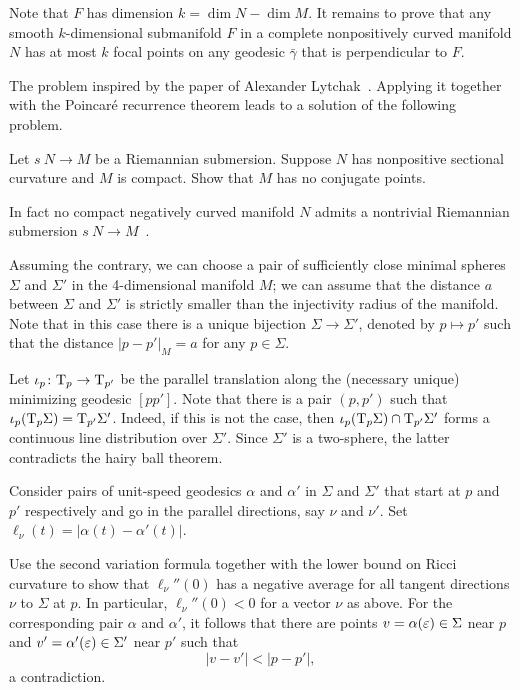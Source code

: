 Note that $F$ has dimension $k=\dim N-\dim M$.
It remains to prove that any smooth $k$-dimensional submanifold $F$ in a complete nonpositively curved manifold $N$ has at most $k$ focal points on any geodesic $\bar \gamma$ that is perpendicular to $F$.\qeds

The problem inspired by the paper of Alexander Lytchak~\cite{lytchak:conjugate}.
Applying it together with the Poincar\'e recurrence theorem
leads to a solution of the following problem.

\begin{pr}
Let $s\:N\to M$ be a Riemannian submersion.
Suppose $N$ has nonpositive sectional curvature and $M$ is compact.
Show that $M$ has no conjugate points.
\end{pr}

In fact no compact negatively curved manifold $N$ admits a nontrivial Riemannian submersion $s\:N\to M$~\cite[see Theorem F in][]{zeghib}. 





Assuming the contrary,
we can choose a pair of sufficiently close minimal spheres $\Sigma$ and $\Sigma'$ in the 4-dimensional manifold $M$;
we can assume that the distance $a$ between $\Sigma$ and $\Sigma'$ is strictly smaller than the injectivity radius of the manifold.
Note that in this case there is a unique bijection $\Sigma\to \Sigma'$, denoted by $p\mapsto p'$ such that the distance $|p-p'|_M=a$ for any $p\in\Sigma$.

Let $\iota_p\colon\mathrm{T}_p\to\mathrm{T}_{p'}$ be the parallel translation along the (necessary unique) minimizing geodesic $[pp']$.
Note that there is a pair $(p,p')$ such that $\iota_p(\mathrm{T}_p\Sigma)=\mathrm{T}_{p'}\Sigma'$.
Indeed, if this is not the case, then $\iota_p(\T_p\Sigma)\z\cap\T_{p'}\Sigma'$ forms a continuous line distribution over $\Sigma'$.
Since $\Sigma'$ is a two-sphere, the latter contradicts the hairy ball theorem.

Consider pairs of unit-speed geodesics $\alpha$ and $\alpha'$ 
in $\Sigma$ and $\Sigma'$  
that start at $p$ and $p'$ respectively
and go in the parallel directions, say $\nu$ and $\nu'$. %
Set $\ell_\nu(t)=|\alpha(t)-\alpha'(t)|$.

Use the second variation formula together with the lower bound on Ricci curvature
to show that $\ell_\nu''(0)$ has a negative average for all tangent directions $\nu$ to $\Sigma$ at $p$. 
In particular, $\ell_\nu''(0)<0$ for a vector $\nu$ as above.
For the corresponding pair $\alpha$ and $\alpha'$,
it follows that there are points $v=\alpha(\varepsilon)\in\Sigma$ near $p$ 
and $v'=\alpha'(\varepsilon)\in\Sigma'$ near $p'$
such that 
\[|v-v'|<|p-p'|,\]
a contradiction.\qeds

